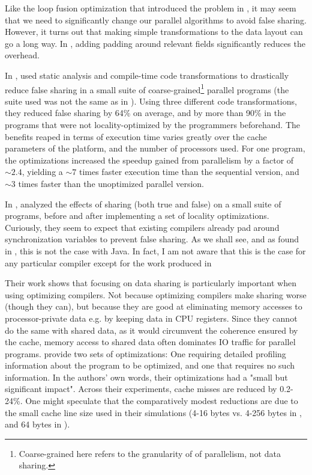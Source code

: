 Like the loop fusion optimization that introduced the problem in \cite{mystery},
it may seem that we need to significantly change our parallel algorithms to
avoid false sharing. However, it turns out that making simple transformations to
the data layout can go a long way. In \cite{mystery}, adding padding around
relevant fields significantly reduces the overhead.

In \citeyear{eggersReducing}, \citeauthor{eggersReducing} used static analysis
and compile-time code transformations to drastically reduce false sharing in a
small suite of coarse-grained\footnote{Coarse-grained here refers to the
granularity of of parallelism, not data sharing.} parallel programs
\cite{eggersReducing} (the suite used was not the same as in \cite{eggersbus}).
Using three different code transformations, they reduced false sharing by 64\%
on average, and by more than 90\% in the programs that were not
locality-optimized by the programmers beforehand. The benefits reaped in terms
of execution time varies greatly over the cache parameters of the platform, and
the number of processors used. For one program, the optimizations increased the
speedup gained from parallelism by a factor of $\sim 2.4$, yielding a $\sim 7$
times faster execution time than the sequential version, and $\sim 3$ times
faster than the unoptimized parallel version.

In \citeyear{TorrellasShared}, \citeauthor{TorrellasShared}
\cite{TorrellasShared} analyzed the effects of sharing (both true and false)
on a small suite of programs, before and after implementing a set of locality
optimizations. Curiously, they seem to expect that existing compilers already
pad around synchronization variables to prevent false sharing. As we shall see,
and as found in \cite{mystery}, this is not the case with Java. In fact, I am
not aware that this is the case for any particular compiler except for the work
produced in \cite{eggersReducing}

Their work \cite{TorrellasShared} shows that focusing on data sharing is
particularly important when using optimizing compilers. Not because optimizing
compilers make sharing worse (though they can), but because they are good at
eliminating memory accesses to processor-private data e.g. by keeping data in
CPU registers. Since they cannot do the same with shared data, as it would
circumvent the coherence ensured by the cache, memory access to shared data
often dominates IO traffic for parallel programs.
\citeauthor{TorrellasShared}  \cite{TorrellasShared}
provide two sets of optimizations: One requiring detailed profiling information
about the program to be optimized, and one that requires no such information. In
the authors' own words, their optimizations had a "small but significant
impact". Across their experiments, cache misses are reduced by 0.2-24\%. One
might speculate that the comparatively modest reductions are due to the small
cache line size used in their simulations (4-16 bytes vs. 4-256 bytes in
\cite{eggersReducing}, and 64 bytes in \cite{mystery}).


